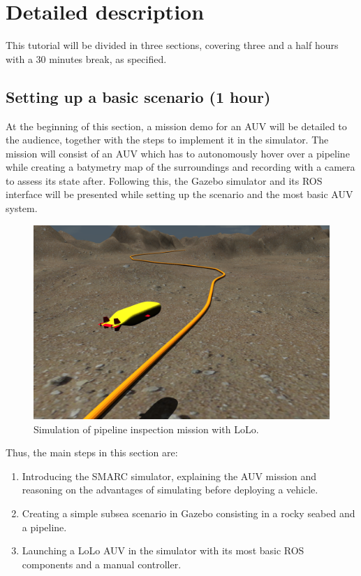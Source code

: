 \documentclass[
10pt, %
a4paper, %
oneside, %
headinclude,footinclude, %
BCOR5mm, %
]{scrartcl}
\title{\normalfont{Tutorial outline}} %
\date{} %
\begin{document}
\maketitle %

\section{Detailed description}
\label{sec:draft}
This tutorial will be divided in three sections, covering three and a half hours with a 30 minutes break, as specified. 

\subsection{\textbf{Setting up a basic scenario (1 hour)}}
At the beginning of this section, a mission demo for an AUV will be detailed to the audience, together with the steps to implement it in the simulator.
The mission will consist of an AUV which has to autonomously hover over a pipeline while creating a batymetry map of the surroundings and recording with a camera to assess its state after.
Following this, the Gazebo simulator and its ROS interface will be presented while setting up the scenario and the most basic AUV system.

\begin{figure}[h]
    \centering
    \includegraphics[width=0.9\linewidth]{Figures/sim_pipeline.png}
    \caption{Simulation of pipeline inspection mission with LoLo.}
\label{fig:lolo_gazebo}
\end{figure}

Thus, the main steps in this section are:
\begin{enumerate}
	\item Introducing the SMARC simulator, explaining the AUV mission and reasoning on the advantages of simulating before deploying a vehicle.
	\item Creating a simple subsea scenario in Gazebo consisting in a rocky seabed and a pipeline.
	\item Launching a LoLo AUV in the simulator with its most basic ROS components and a manual controller.
\end{enumerate}
\end{document}
